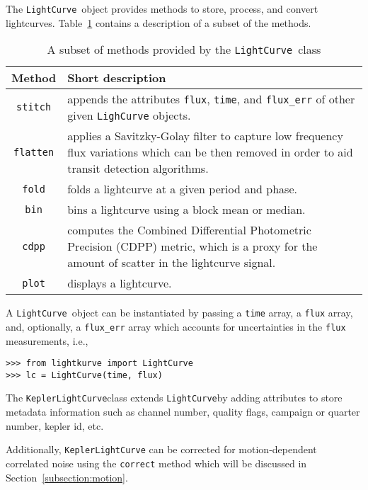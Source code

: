 \documentclass[twocolumn]{aastex62}
\newcommand{\LightCurve}{\texttt{LightCurve}} d
\newcommand{\KeplerLightCurve}{\texttt{KeplerLightCurve}}
\begin{document}
        The \LightCurve~object provides methods to store, process, and
        convert lightcurves. Table~\ref{tab:methods} contains a description
        of a subset of the methods.

        \begin{table}[!htb]
            \centering
            \caption{A subset of methods provided by the \LightCurve~class}
            \begin{tabular}{cp{6.5cm}}
                \hline
                \textbf{Method} & \textbf{Short description} \\
                \hline
                \texttt{stitch} & appends the attributes \texttt{flux},
                \texttt{time}, and \texttt{flux\_err} of other given
                \texttt{LighCurve} objects.\\
                \texttt{flatten} & applies a Savitzky-Golay filter to capture
                low frequency flux variations which can be then removed in order
                to aid transit detection algorithms.\\
                \texttt{fold} & folds a lightcurve at a given period and phase.\\
                \texttt{bin} &  bins a lightcurve using a block mean or median.\\
                \texttt{cdpp} &  computes the Combined Differential Photometric
                Precision (CDPP) metric, which is a proxy for the amount of
                scatter in the lightcurve signal. \\
                \texttt{plot} & displays a lightcurve.
            \end{tabular}
            \label{tab:methods}
        \end{table}

        A \LightCurve~object can be instantiated by passing a \texttt{time}
        array, a \texttt{flux} array, and, optionally, a \texttt{flux\_err} array
        which accounts for uncertainties in the \texttt{flux} measurements, i.e.,
\begin{verbatim}
>>> from lightkurve import LightCurve
>>> lc = LightCurve(time, flux)
\end{verbatim}

       The \KeplerLightCurve class extends \LightCurve by
       adding attributes to store metadata information such as channel number,
       quality flags, campaign or quarter number, kepler id, etc.

       Additionally, \texttt{KeplerLightCurve} can be corrected for motion-dependent
       correlated noise using the \texttt{correct} method which will be discussed in
       Section~\ref{subsection:motion}.
\end{document}
